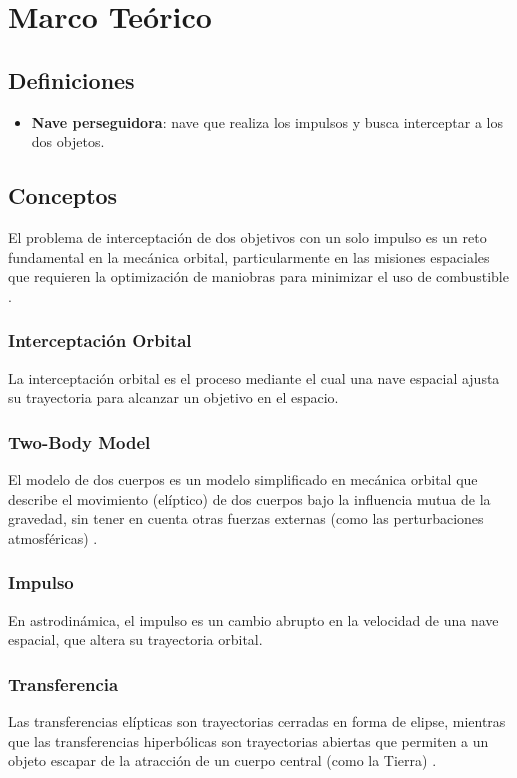 \section{Marco Teórico}
\subsection{Definiciones}
\begin{itemize}
    \item \textbf{Nave perseguidora}: nave que realiza los impulsos y busca interceptar a los dos objetos.
\end{itemize}

\subsection{Conceptos}
El problema de interceptación de dos objetivos con un solo
impulso es un reto fundamental en la mecánica orbital, particularmente en las
misiones espaciales que requieren la optimización de maniobras para
minimizar el uso de combustible \parencite{Battin1999}.
\subsubsection{Interceptación Orbital}
La interceptación orbital es el proceso
mediante el cual una nave espacial ajusta su trayectoria para alcanzar
un objetivo en el espacio.
\subsubsection{Two-Body Model}
El modelo de dos cuerpos es un modelo simplificado en mecánica orbital
que describe el movimiento (elíptico) de dos cuerpos bajo la influencia
mutua de la gravedad, sin tener en cuenta otras fuerzas externas (como las
perturbaciones atmosféricas) \parencite{Cerf2013}.
\subsubsection{Impulso}
En astrodinámica, el impulso es un cambio abrupto en la
velocidad de una nave espacial, que altera su trayectoria orbital.
\subsubsection{Transferencia}
Las transferencias elípticas
son trayectorias cerradas en forma de elipse, mientras que las
transferencias hiperbólicas son trayectorias abiertas que permiten a
un objeto escapar de la atracción de un cuerpo central (como la
Tierra) \parencite{ZHU20162177}.
